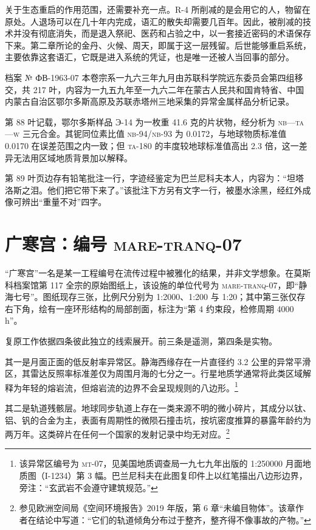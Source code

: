 关于生态重启的作用范围，还需要补充一点。R-4 所削减的是会用它的人，物留在原处。人退场可以在几十年内完成，语汇的散失却需要几百年。因此，被削减的技术并没有彻底消失，而是退入祭祀、医药和占验之中，以一套接近密码的术语保存下来。第二章所论的金丹、火候、周天，即属于这一层残留。后世能够重启系统，主要依靠这套语汇，它既是进入系统的凭证，也是唯一还被人当回事的部分。

\begin{archive}{档案 № ФВ-1963-07}
本卷宗系一九六三年九月由苏联科学院远东委员会第四组移交，共 217 叶，内容为一九五九年至一九六二年在蒙古人民共和国肯特省、中国内蒙古自治区鄂尔多斯高原及苏联赤塔州三地采集的异常金属样品分析记录。

第 88 叶记载，鄂尔多斯样品 Э-14 为一枚重 41.6 克的片状物，经分析为 \textsc{nb}—\textsc{ta}—\textsc{w} 三元合金。其铌同位素比值 \textsc{nb}-94/\textsc{nb}-93 为 0.0172，与地球物质标准值 0.0170 在误差范围之内一致；但 \textsc{ta}-180 的丰度较地球标准值高出 2.3 倍，这一差异无法用区域地质背景加以解释。

第 89 叶页边存有铅笔批注一行，字迹经鉴定为巴兰尼科夫本人，内容为：“坦塔洛斯之泪。他们把它带下来了。”该批注下方另有文字一行，被墨水涂黑，经红外成像可辨出“重量不对”四字。
\end{archive}

\section{广寒宫：编号 \textsc{mare-tranq-07}}

“广寒宫”一名是某一工程编号在流传过程中被雅化的结果，并非文学想象。在莫斯科档案馆第 117 全宗的原始图纸上，该设施的单位代号为 \textsc{mare-tranq-07}，即“静海七号”。图纸现存三张，比例尺分别为 1:2000、1:200 与 1:20；其中第三张仅存右下角，绘有一座环形结构的局部剖面，标注为“第 4 约束段，检修周期 4000 h”。

复原工作依据四条彼此独立的线索展开。前三条是遥测，第四条是实物。

其一是月面正面的低反射率异常区。静海西缘存在一片直径约 3.2 公里的异常平滑区，其雷达反照率标准差仅为周围月海的七分之一。行星地质学通常将此类区域解释为年轻的熔岩流，但熔岩流的边界不会呈现规则的八边形。\footnote{该异常区编号为 \textsc{mt}-07，见美国地质调查局一九七九年出版的 1:250000 月面地质图（I-1234）第 3 幅。巴兰尼科夫在此图复印件上以红笔描出八边形边界，旁注：“玄武岩不会遵守建筑规范。”}

其二是轨道残骸层。地球同步轨道上存在一类来源不明的微小碎片，其成分以钛、铝、钒的合金为主，表面有周期性的微陨石撞击坑，按坑密度推算的暴露年龄约为两万年。这类碎片在任何一个国家的发射记录中均无对应。\footnote{参见欧洲空间局《空间环境报告》2019 年版，第 6 章“未编目物体”。该章作者在结论中写道：“它们的轨道倾角分布过于整齐，整齐得不像事故的产物。”}

